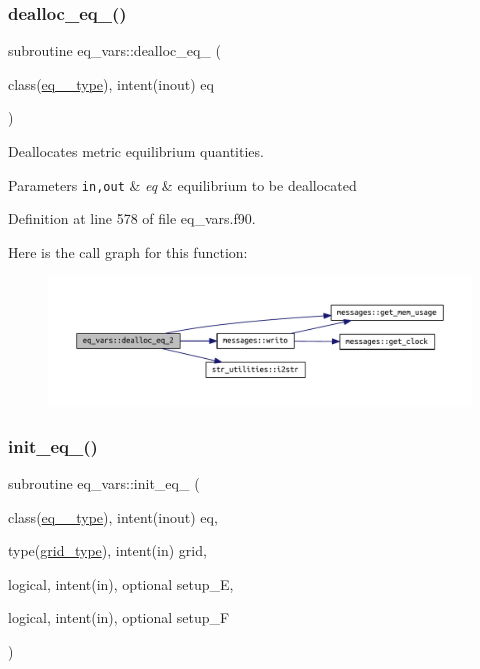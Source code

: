 \subsubsection{\texorpdfstring{dealloc\+\_\+eq\+\_()}{dealloc\_eq\_2()}}
{\footnotesize\ttfamily subroutine eq\+\_\+vars\+::dealloc\+\_\+eq\+\_ (\begin{DoxyParamCaption}\item[{class(\hyperlink{structeq__vars_1_1eq__2__type}{eq\+\_\+2\+\_\+type}), intent(inout)}]{eq }\end{DoxyParamCaption})}



Deallocates metric equilibrium quantities. 


\begin{DoxyParams}[1]{Parameters}
\mbox{\tt in,out}  & {\em eq} & equilibrium to be deallocated \\
\hline
\end{DoxyParams}


Definition at line 578 of file eq\+\_\+vars.\+f90.

Here is the call graph for this function\+:\nopagebreak
\begin{figure}[H]
\begin{center}
\leavevmode
\includegraphics[width=350pt]{namespaceeq__vars_a206698a627df7d8285921ee4a9f75c11_cgraph}
\end{center}
\end{figure}
\mbox{\label{namespaceeq__vars_a0270785c6b513c53e6d7c837f38f377b}} 
\subsubsection{\texorpdfstring{init\+\_\+eq\+\_()}{init\_eq\_1()}}
{\footnotesize\ttfamily subroutine eq\+\_\+vars\+::init\+\_\+eq\+\_ (\begin{DoxyParamCaption}\item[{class(\hyperlink{structeq__vars_1_1eq__1__type}{eq\+\_\+1\+\_\+type}), intent(inout)}]{eq,  }\item[{type(\hyperlink{structgrid__vars_1_1grid__type}{grid\+\_\+type}), intent(in)}]{grid,  }\item[{logical, intent(in), optional}]{setup\+\_\+E,  }\item[{logical, intent(in), optional}]{setup\+\_\+F }\end{DoxyParamCaption})}



